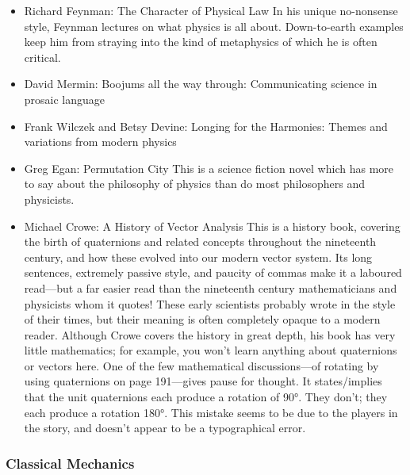\documentclass[10pt,a4paper]{book}
\theoremstyle{definition}
\begin{document}
\begin{itemize}
\item Richard Feynman: The Character of Physical Law
In his unique no-nonsense style, Feynman lectures on what physics is all about.  Down-to-earth examples keep him from straying into the kind of metaphysics of which he is often critical.
\item David Mermin: Boojums all the way through: Communicating science in prosaic language
\item Frank Wilczek and Betsy Devine: Longing for the Harmonies: Themes and variations from modern physics
\item Greg Egan: Permutation City
This is a science fiction novel which has more to say about the philosophy of physics than do most philosophers and physicists.
\item Michael Crowe: A History of Vector Analysis
This is a history book, covering the birth of quaternions and related concepts throughout the nineteenth century, and how these evolved into our modern vector system.  Its long sentences, extremely passive style, and paucity of commas make it a laboured read—but a far easier read than the nineteenth century mathematicians and physicists whom it quotes!  These early scientists probably wrote in the style of their times, but their meaning is often completely opaque to a modern reader.  Although Crowe covers the history in great depth, his book has very little mathematics; for example, you won't learn anything about quaternions or vectors here.  One of the few mathematical discussions—of rotating by using quaternions on page 191—gives pause for thought.  It states/implies that the unit quaternions each produce a rotation of 90°.  They don't; they each produce a rotation 180°.  This mistake seems to be due to the players in the story, and doesn't appear to be a typographical error.
\end{itemize}


\subsubsection{Classical Mechanics}
\end{document}
